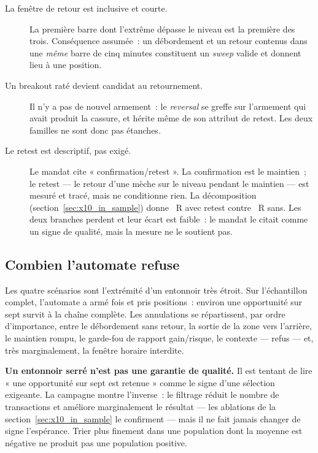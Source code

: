 \begin{description}
  \item[La fenêtre de retour est inclusive et courte.] La première barre dont
  l'extrême dépasse le niveau est la première des trois. Conséquence assumée~:
  un débordement et un retour contenus dans une \emph{même} barre de cinq
  minutes constituent un \emph{sweep} valide et donnent lieu à une position.
  \item[Un breakout raté devient candidat au retournement.] Il n'y a pas de
  nouvel armement~: le \emph{reversal} se greffe sur l'armement qui avait
  produit la cassure, et hérite même de son attribut de retest. Les deux
  familles ne sont donc pas étanches.
  \item[Le retest est descriptif, pas exigé.] Le mandat cite
  « confirmation/retest ». La confirmation est le maintien~; le retest --- le
  retour d'une mèche sur le niveau pendant le maintien --- est mesuré et
  tracé, mais ne conditionne rien. La décomposition
  (section~\ref{sec:x10_in_sample}) donne \XTenRetestR{}~R avec retest contre
  \XTenNoRetestR{}~R sans. Les deux branches perdent et leur écart est faible~:
  le mandat le citait comme un signe de qualité, mais la mesure ne le soutient
  pas.
\end{description}

\subsection{Combien l'automate refuse}

Les quatre scénarios sont l'extrémité d'un entonnoir très étroit. Sur
l'échantillon complet, l'automate a armé \XTenArmCount{} fois et pris
\XTenTradesIS{} positions~: environ une opportunité sur sept survit à la
chaîne complète. Les \XTenCancelCount{} annulations se répartissent, par
ordre d'importance, entre le débordement sans retour, la sortie de la zone
vers l'arrière, le maintien rompu, le garde-fou de rapport gain/risque, le
contexte --- \XTenContextRefusals{} refus --- et, très marginalement, la
fenêtre horaire interdite.

\begin{insightbox}
\textbf{Un entonnoir serré n'est pas une garantie de qualité.} Il est tentant
de lire « une opportunité sur sept est retenue » comme le signe d'une
sélection exigeante. La campagne montre l'inverse~: le filtrage réduit le
nombre de transactions et améliore marginalement le résultat --- les ablations
de la section~\ref{sec:x10_in_sample} le confirment --- mais il ne fait jamais
changer de signe l'espérance. Trier plus finement dans une population dont la
moyenne est négative ne produit pas une population positive.
\end{insightbox}
